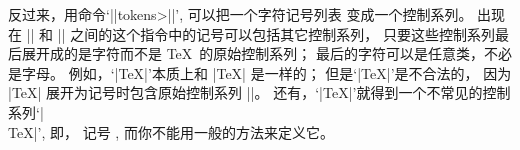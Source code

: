 {{{{%
\ddanger 反过来，用命令`|\csname|\<tokens>|\endcsname|', 可以把一个字符记号列表%
变成一个控制系列。%
出现在 |\csname| 和 |\endcsname| 之间的这个指令中的记号可以包括其它控制系列，
只要这些控制系列最后展开成的是字符而不是 \TeX\ 的原始控制系列；
最后的字符可以是任意类，不必是字母。%
例如，`|\csname TeX\endcsname|'本质上和 |\TeX| 是一样的；
但是`|\csname\TeX\endcsname|'是不合法的，
因为 |\TeX| 展开为记号时包含原始控制系列 |\kern|。
还有，`|\csname\string\TeX\endcsname|'就得到一个不常见的控制系列`|\\TeX|', 即，
记号 , 而你不能用一般的方法来定义它。

}}}}
